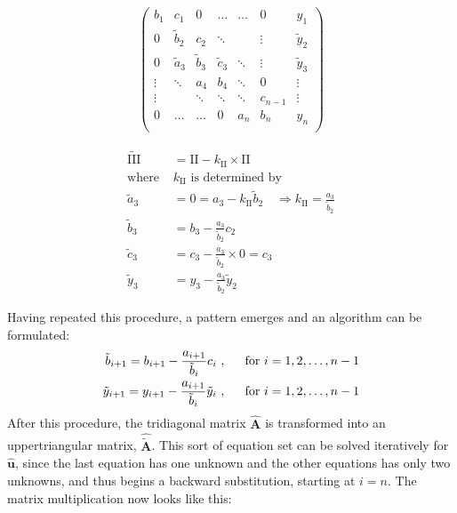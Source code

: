 \documentclass[11pt,a4paper,notitlepage]{article}
\begin{document}
\begin{minipage}{0.5\linewidth}
\begin{align*}
\left(\begin{matrix}
  b_1   & c_1    & 0      & \dots   & \dots  & 0       & y_1     \\
  0   & \tilde{b}_2    & c_2    & \ddots  &        & \vdots  & \tilde{y}_2  \\
  0     & \tilde{a}_3    & \tilde{b}_3    & \tilde{c}_3     & \ddots & \vdots  & \tilde{y}_3  \\
 \vdots & \ddots & a_4    & b_4     & \ddots & 0       & \vdots  \\
 \vdots &        & \ddots & \ddots  & \ddots & c_{n-1}     & \vdots  \\
  0     & \dots  & \dots  & 0       & a_{n}  & b_n     & y_{n}   \\
\end{matrix}\right)
\end{align*}
\end{minipage}
\begin{minipage}{0.5\linewidth}
	\begin{align*}
	\tilde{\text{III}} &= \text{II} - k_\text{II} \times \text{II}\\
	\text{where }&k_\text{II} \text{ is determined by}\\
\tilde{a}_3 &= 0 = a_3 - k_\text{II}\tilde{b}_2 \quad \Rightarrow k_\text{II} = \frac{a_3}{\tilde{b}_2}\\
	\tilde{b}_3 &= b_3 - \frac{a_3}{\tilde{b}_2} c_2 \\
	\tilde{c}_3 &= c_3 - \frac{a_3}{\tilde{b}_2} \times 0 = c_3 \\
	\tilde{y}_3 &= y_3 - \frac{a_3}{\tilde{b}_2} \tilde{y}_2
	\end{align*}
\end{minipage}

Having repeated this procedure, a pattern emerges and an algorithm can be formulated:
\begin{align*}
	\tilde{b}_{i+1} = b_{i+1} - \frac{a_{i+1}}{\tilde{b}_i} c_{i}\ , \indent \text{for $	i = 1,2,\dots, n-1$} \\
	\tilde{y}_{i+1} = y_{i+1} - \frac{a_{i+1}}{\tilde{b}_i} \tilde{y}_i\ , \indent \text{for $	i = 1,2,\dots, n-1$}
\end{align*}
After this procedure, the tridiagonal matrix $\mathbf{\hat{A}}$ is transformed into an uppertriangular matrix, $\mathbf{\hat{\tilde{A}}}$. This sort of equation set can be solved iteratively for $\mathbf{\hat{u}}$, since the last equation has one unknown and the other equations has only two unknowns, and thus begins a backward substitution, starting at $i = n$. The matrix multiplication now looks like this:
\end{document}
